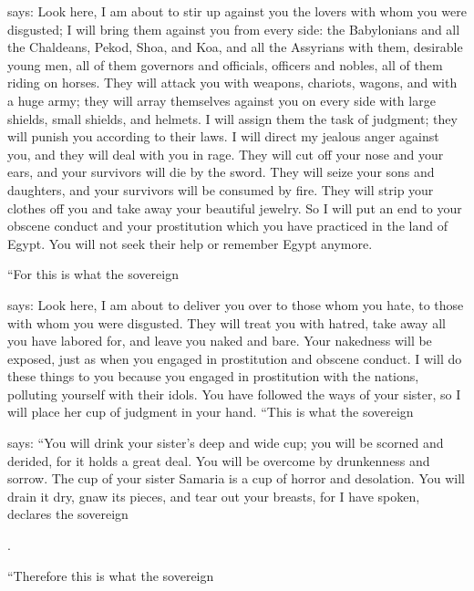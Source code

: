 {{}
says: Look
here, I am about to stir
up against
you the
lovers
with whom
you were disgusted;
I will bring
them against
you from every side:
the Babylonians
and all
the Chaldeans,
Pekod,
Shoa,
and Koa,
and all
the Assyrians
with
them, desirable
young men,
all
of them governors
and officials,
officers
and nobles,
all
of them riding
on horses.
They will attack
you with weapons,
chariots,
wagons,
and with a huge army;
they will array
themselves against
you on every side
with large shields,
small shields,
and helmets.
I will assign
them the task
of judgment;
they will punish
you according to their laws.
I will direct
my jealous
anger against you, and they will deal
with
you in rage.
They will cut off
your nose
and your ears,
and your survivors
will die
by the sword.
They
will seize
your sons
and daughters,
and your survivors
will be consumed
by fire.
They will strip
your clothes
off you and take
away your beautiful
jewelry.
So I will put an end
to your obscene
conduct
and your prostitution
which you have practiced
in the land
of Egypt.
You will not
seek their help or remember
Egypt
anymore.
\par }{\PP {}“For
this is what
the sovereign

{}
says: Look
here, I am about to deliver
you over
to those whom
you hate,
to those with whom
you were disgusted.
They will treat
you with
hatred,
take away
all
you have labored
for, and leave
you naked
and bare.
Your nakedness
will be exposed,
just as when you engaged in prostitution
and obscene
conduct.
I will do
these
things to you because you engaged in prostitution
with the nations,
polluting
yourself with their idols.
You have followed
the ways
of your sister,
so
I will place
her cup
of judgment in your hand.
“This is what
the sovereign

{}
says: “You will drink
your sister’s
deep
and wide
cup;
you will be
scorned
and derided,
for it holds
a great deal.
You will be overcome
by drunkenness
and sorrow.
The cup
of your sister
Samaria
is a cup
of horror
and desolation.
You will drain
it dry, gnaw
its pieces, and tear out your breasts,
for
I
have spoken,
declares
the sovereign

{}.
\par }{\PP {}“Therefore
this is what
the sovereign

}
